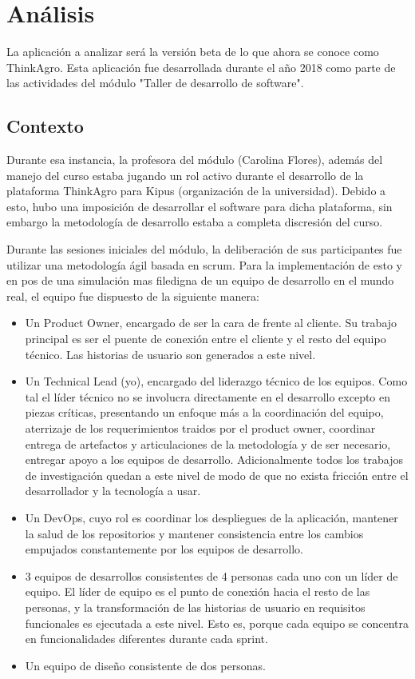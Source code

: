 \section{Análisis}

La aplicación a analizar será la versión beta de lo que ahora se conoce como ThinkAgro. Esta aplicación fue desarrollada durante el año 2018 como parte de las actividades del módulo "Taller de desarrollo de software".

\subsection{Contexto}

Durante esa instancia, la profesora del módulo (Carolina Flores), además del manejo del curso estaba jugando un rol activo durante el desarrollo de la plataforma ThinkAgro para Kipus (organización de la universidad). Debido a esto, hubo una imposición de desarrollar el software para dicha plataforma, sin embargo la metodología de desarrollo estaba a completa discresión del curso.

Durante las sesiones iniciales del módulo, la deliberación de sus participantes fue utilizar una metodología ágil basada en scrum. Para la implementación de esto y en pos de una simulación mas filedigna de un equipo de desarrollo en el mundo real, el equipo fue dispuesto de la siguiente manera:

\begin{itemize}
    \item Un Product Owner, encargado de ser la cara de frente al cliente. Su trabajo principal es ser el puente de conexión entre el cliente y el resto del equipo técnico. Las historias de usuario son generados a este nivel.
    \item Un Technical Lead (yo), encargado del liderazgo técnico de los equipos. Como tal el líder técnico no se involucra directamente en el desarrollo excepto en piezas críticas, presentando un enfoque más a la coordinación del equipo, aterrizaje de los requerimientos traidos por el product owner, coordinar entrega de artefactos y articulaciones de la metodología y de ser necesario, entregar apoyo a los equipos de desarrollo. Adicionalmente todos los trabajos de investigación quedan a este nivel de modo de que no exista fricción entre el desarrollador y la tecnología a usar.
    \item Un DevOps, cuyo rol es coordinar los despliegues de la aplicación, mantener la salud de los repositorios y mantener consistencia entre los cambios empujados constantemente por los equipos de desarrollo.
    \item 3 equipos de desarrollos consistentes de 4 personas cada uno con un líder de equipo. El líder de equipo es el punto de conexión hacia el resto de las personas, y la transformación de las historias de usuario en requisitos funcionales es ejecutada a este nivel. Esto es, porque cada equipo se concentra en funcionalidades diferentes durante cada sprint.
    \item Un equipo de diseño consistente de dos personas.
\end{itemize}


